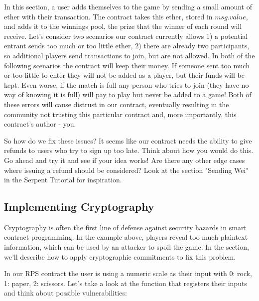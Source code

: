 \documentclass[10pt,twocolumn,letterpaper]{article}
\begin{document}
In this section, a user adds themselves to the game by sending a small amount of ether with their transaction. The contract takes this ether, stored in $msg.value$, and adds it to the winnings pool, the prize that the winner of each round will receive. Let's consider two scenarios our contract currently allows 1) a potential entrant sends too much or too little ether, 2) there are already two participants, so additional players send transactions to join, but are not allowed. In both of the following scenarios the contract will keep their money. If someone sent too much or too little to enter they will not be added as a player, but their funds will be kept. Even worse, if the match is full any person who tries to join (they have no way of knowing it is full) will pay to play but never be added to a game! Both of these errors will cause distrust in our contract, eventually resulting in the community not trusting this particular contract and, more importantly, this contract's author - you.

So how do we fix these issues? It seems like our contract needs the ability to give refunds to users who try to sign up too late. Think about how you would do this. Go ahead and try it and see if your idea works! Are there any other edge cases where issuing a refund should be considered? Look at the section "Sending Wei" in the Serpent Tutorial for inspiration.

\subsection{Implementing Cryptography}
Cryptography is often the first line of defense against security hazards in smart contract programming. In the example above, players reveal too much plaintext information, which can be used by an attacker to spoil the game. In the section, we'll describe how to apply cryptographic commitments to fix this problem.

In our RPS contract the user is using a numeric scale as their input with 0: rock, 1: paper, 2: scissors. Let's take a look at the function that registers their inputs and think about possible vulnerabilities:

\end{document}
